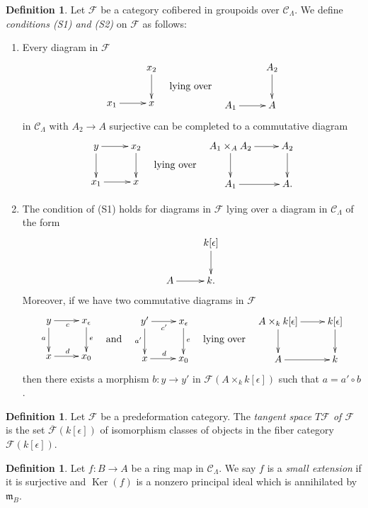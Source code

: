 \documentclass{amsart}
\theoremstyle{plain}
\theoremstyle{definition}
\newtheorem{definition}[subsection]{Definition}
\theoremstyle{remark}
\numberwithin{equation}{subsection}
\def\Ker{\mathop{\mathrm{Ker}}}
\begin{document}
\begin{definition}
\label{definition-S1-S2}
Let $\mathcal{F}$ be a category cofibered in groupoids over $\mathcal
C_\Lambda$. We define {\it conditions (S1) and (S2)}
on $\mathcal{F}$ as follows:
\begin{enumerate}
\item[(S1)] Every diagram in $\mathcal{F}$
$$
\vcenter{
\xymatrix{
           & x_2 \ar[d] \\
x_1 \ar[r] & x
}
}
\quad\text{lying over}\quad
\vcenter{
\xymatrix{
           & A_2 \ar[d] \\
A_1 \ar[r] & A
}
}
$$
in $\mathcal{C}_\Lambda$ with $A_2 \to A$ surjective can be completed
to a commutative diagram
$$
\vcenter{
\xymatrix{
y \ar[r] \ar[d] & x_2 \ar[d] \\
x_1 \ar[r]      & x
}
}
\quad\text{lying over}\quad
\vcenter{
\xymatrix{
A_1 \times_A A_2 \ar[r] \ar[d] & A_2 \ar[d] \\
A_1 \ar[r]      & A.
}
}
$$
\item[(S2)]
The condition of (S1) holds for diagrams in $\mathcal{F}$ lying over
a diagram in $\mathcal{C}_\Lambda$ of the form
$$
\xymatrix{
          & k[\epsilon] \ar[d] \\
A  \ar[r] & k.
}
$$
Moreover, if we have two commutative diagrams in $\mathcal{F}$
$$
\vcenter{
\xymatrix{
y \ar[r]_c \ar[d]_a & x_\epsilon \ar[d]^e \\
x \ar[r]^d          & x_0
}
}
\quad\text{and}\quad
\vcenter{
\xymatrix{
y' \ar[r]_{c'} \ar[d]_{a'} & x_\epsilon \ar[d]^e \\
x \ar[r]^d                 & x_0
}
}
\quad\text{lying over}\quad
\vcenter{
\xymatrix{
A \times_k k[\epsilon] \ar[r] \ar[d] & k[\epsilon] \ar[d] \\
A  \ar[r] & k
}
}
$$
then there exists a morphism $b : y \to y'$ in
$\mathcal{F}(A \times_k k[\epsilon])$ such that $a = a' \circ b$.
\end{enumerate}
\end{definition}

\begin{definition}
\label{definition-tangent-space}
Let $\mathcal{F}$ be a predeformation category.
The {\it tangent space $T \mathcal{F}$ of $\mathcal{F}$}
is the set $\overline{\mathcal{F}}(k[\epsilon])$
of isomorphism classes of objects in the fiber category $\mathcal
F(k[\epsilon])$.
\end{definition}

\begin{definition}
\label{definition-small-extension}
Let $f: B \to A$ be a ring map in $\mathcal{C}_\Lambda$.  We say $f$
is a {\it small extension} if it is surjective and $\Ker(f)$ is a nonzero
principal ideal which is annihilated by $\mathfrak{m}_B$.
\end{definition}
\end{document}
